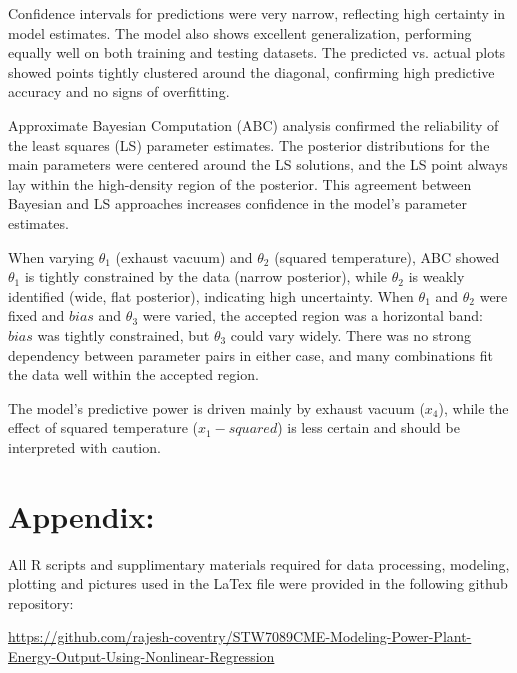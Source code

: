 \documentclass[12pt,a4paper]{article}
\begin{document}
Confidence intervals for predictions were very narrow, reflecting high 
certainty in model estimates. The model also shows excellent 
generalization, performing equally well on both training and 
testing datasets. The predicted vs. actual plots showed points 
tightly clustered around the diagonal, confirming high predictive 
accuracy and no signs of overfitting. 

Approximate Bayesian Computation (ABC) analysis confirmed the 
reliability of the least squares (LS) parameter estimates. 
The posterior distributions for the main parameters were 
centered around the LS solutions, and the LS point always lay 
within the high-density region of the posterior. This agreement 
between Bayesian and LS approaches increases confidence in 
the model’s parameter estimates. 

When varying $\theta_1$ (exhaust vacuum) and $\theta_2$ (squared temperature), 
ABC showed $\theta_1$ is tightly constrained by the data (narrow posterior), 
while $\theta_2$ is weakly identified (wide, flat posterior), 
indicating high uncertainty. When $\theta_1$ and $\theta_2$ were fixed and $bias$ 
and $\theta_3$ were varied, the accepted region was a horizontal band: $bias$ 
was tightly constrained, but $\theta_3$ could vary widely. There was no strong 
dependency between parameter pairs in either case, and many 
combinations fit the data well within the accepted region.

The model’s predictive power is driven mainly by exhaust 
vacuum ($x_4$), while the effect of squared temperature ($x_1-squared$) 
is less certain and should be interpreted with caution.


\section*{Appendix:}

All R scripts and supplimentary materials required for data processing, modeling, 
plotting and pictures used in the LaTex file were provided in the following github repository: 

\href{https://github.com/rajesh-coventry/STW7089CME-Modeling-Power-Plant-Energy-Output-Using-Nonlinear-Regression}{https://github.com/rajesh-coventry/STW7089CME-Modeling-Power-Plant-Energy-Output-Using-Nonlinear-Regression}


\end{document}
